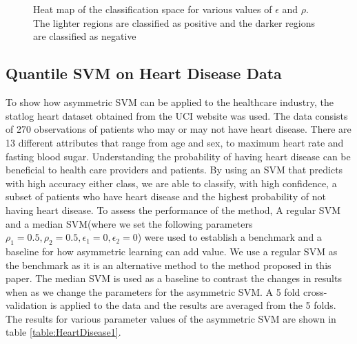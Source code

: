 \begin{figure}[htp]
  \begin{center}
     \\
     \\
  \end{center}
  \caption{Heat map of the classification space for various values of $\epsilon$ and $\rho$. The lighter regions are classified as positive and the darker regions are classified as negative}
  \label{fig:edge}
\end{figure}



\subsection{Quantile SVM on Heart Disease Data}
To show how asymmetric SVM can be applied to the healthcare industry, the statlog heart dataset obtained from the UCI website was used. The data consists of 270 observations of patients who may or may not have heart disease. There are 13 different attributes that range from age and sex, to maximum heart rate and fasting blood sugar. Understanding the probability of having heart disease can be beneficial to health care providers and patients. By using an SVM that predicts with high accuracy either class, we are able to classify, with high confidence, a subset of patients who have heart disease and the highest probability of not having heart disease. To assess the performance of the method, A regular SVM and a median SVM(where we set the following parameters $\rho_1=0.5,\rho_2=0.5,\epsilon_1=0,\epsilon_2=0$) were used to establish a benchmark and a baseline for how asymmetric learning can add value. We use a regular SVM as the benchmark as it is an alternative method to the method proposed in this paper. The median SVM is used as a baseline to contrast the changes in results when as we change the parameters for the asymmetric SVM. A 5 fold cross-validation is applied to the data and the results are averaged from the 5 folds. The results for various parameter values of the asymmetric SVM are shown in table \ref{table:HeartDisease1}. 

